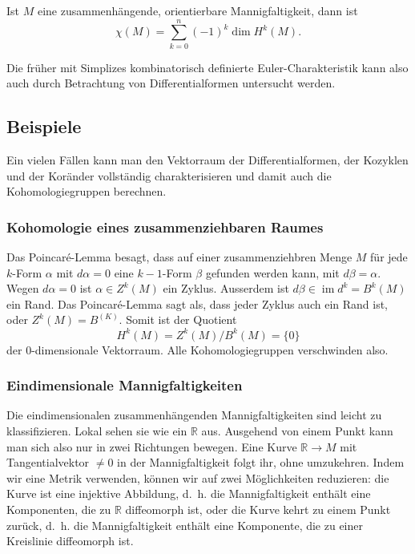 \begin{satz}
Ist $M$ eine zusammenhängende, orientierbare Mannigfaltigkeit, dann ist
\[
\chi(M)
=
\sum_{k=0}^n (-1)^k \dim H^k(M).
\]
\end{satz}

Die früher mit Simplizes kombinatorisch definierte Euler-Charakteristik
kann also auch durch Betrachtung von Differentialformen untersucht
werden.

%
%
\subsection{Beispiele}
Ein vielen Fällen kann man den Vektorraum der Differentialformen,
der Kozyklen und der Koränder vollständig charakterisieren und damit
auch die Kohomologiegruppen berechnen.

%
%
\subsubsection{Kohomologie eines zusammenziehbaren Raumes}
Das Poincaré-Lemma besagt, dass auf einer zusammenziehbren Menge
$M$ für jede $k$-Form $\alpha$ mit $d\alpha=0$ eine $k-1$-Form
$\beta$ gefunden werden kann, mit $d\beta = \alpha$.
Wegen $d\alpha=0$ ist $\alpha\in Z^k(M)$ ein Zyklus.
Ausserdem ist $d\beta\in \operatorname{im}d^k = B^k(M)$ ein Rand.
Das Poincaré-Lemma sagt als, dass jeder Zyklus auch ein Rand ist,
oder $Z^k(M) = B^(K)$.
Somit ist der Quotient
\[
H^k(M)
=
Z^k(M) / B^k(M)
=
\{0\}
\]
der 0-dimensionale Vektorraum.
Alle Kohomologiegruppen verschwinden also.

%
%
\subsubsection{Eindimensionale Mannigfaltigkeiten}
Die eindimensionalen zusammenhängenden Mannigfaltigkeiten sind leicht
zu klassifizieren.
Lokal sehen sie wie ein $\mathbb{R}$ aus.
Ausgehend von einem Punkt kann man sich also nur in zwei Richtungen
bewegen.
Eine Kurve $\mathbb{R}\to M$ mit Tangentialvektor $\ne 0$ in der
Mannigfaltigkeit folgt ihr, ohne umzukehren.
Indem wir eine Metrik verwenden, können wir auf zwei Möglichkeiten
reduzieren: die Kurve ist eine injektive Abbildung, d.~h. die Mannigfaltigkeit
enthält eine Komponenten, die zu $\mathbb{R}$ diffeomorph ist,
oder die Kurve kehrt zu einem Punkt zurück, d.~h. die Mannigfaltigkeit
enthält eine Komponente, die zu einer Kreislinie diffeomorph ist.

